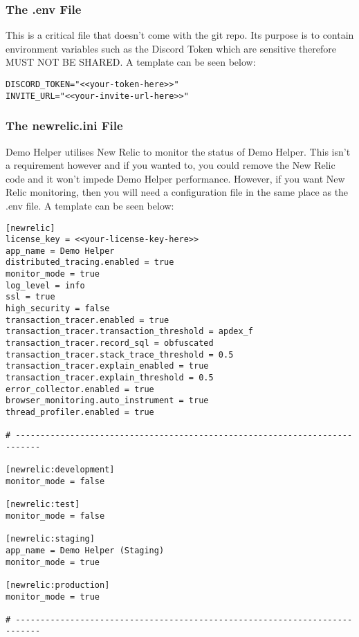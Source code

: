\subsubsection{The .env File}\label{hosting_requirements___prerequisites___the_.env_file}
This is a critical file that doesn't come with the git repo.
Its purpose is to contain environment variables such as the Discord Token which are sensitive therefore MUST NOT BE SHARED.
A template can be seen below:
\begin{verbatim}
DISCORD_TOKEN="<<your-token-here>>"
INVITE_URL="<<your-invite-url-here>>"
\end{verbatim}

\subsubsection{The newrelic.ini File}\label{hosting_requirements___prerequisites___the_newrelic.ini_file}
Demo Helper utilises New Relic to monitor the status of Demo Helper.
This isn't a requirement however and if you wanted to, you could remove the New Relic code and it won't impede Demo Helper performance.
However, if you want New Relic monitoring, then you will need a configuration file in the same place as the .env file.
A template can be seen below:
\begin{verbatim}
[newrelic]
license_key = <<your-license-key-here>>
app_name = Demo Helper
distributed_tracing.enabled = true
monitor_mode = true
log_level = info
ssl = true
high_security = false
transaction_tracer.enabled = true
transaction_tracer.transaction_threshold = apdex_f
transaction_tracer.record_sql = obfuscated
transaction_tracer.stack_trace_threshold = 0.5
transaction_tracer.explain_enabled = true
transaction_tracer.explain_threshold = 0.5
error_collector.enabled = true
browser_monitoring.auto_instrument = true
thread_profiler.enabled = true

# ---------------------------------------------------------------------------

[newrelic:development]
monitor_mode = false

[newrelic:test]
monitor_mode = false

[newrelic:staging]
app_name = Demo Helper (Staging)
monitor_mode = true

[newrelic:production]
monitor_mode = true

# ---------------------------------------------------------------------------
\end{verbatim}



